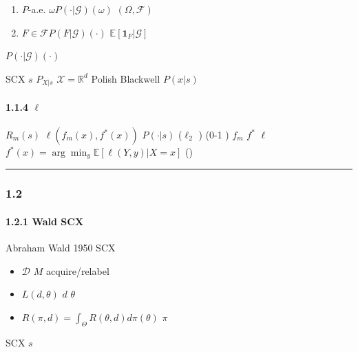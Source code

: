 \documentclass[
  12pt,
]{article}
\providecommand{\tightlist}{%
  \setlength{\itemsep}{0pt}\setlength{\parskip}{0pt}}
\begin{document}
\begin{enumerate}
\def\labelenumi{\arabic{enumi}.}
\tightlist
\item
   \(P\)-a.e. \(\omega\)\(P(\cdot|\mathcal{G})(\omega)\) 
  \((\Omega, \mathcal{F})\) 
\item
   \(F \in \mathcal{F}\)\(P(F|\mathcal{G})(\cdot)\) 
  \(\mathbb{E}[\mathbf{1}_F|\mathcal{G}]\) 
\end{enumerate}

 \(P(\cdot|\mathcal{G})(\cdot)\) 

 SCX  \(s\)  \(P_{X|s}\)
\(\mathcal{X} = \mathbb{R}^d\)  Polish 
Blackwell  \(P(x|s)\) 

\paragraph{\texorpdfstring{1.1.4  \(\ell\)
}{1.1.4  \textbackslash ell }}\label{ux635fux5931ux51fdux6570-ell-ux7684ux53efux79efux6027ux6761ux4ef6}

\(R_m(s)\)  \(\ell(f_m(x), f^*(x))\)  \(P(\cdot|s)\)
 (\(\ell_2\) )  (0-1 ) \(f_m\)
 \(f^*\)  \(\ell\) 
\(f^*(x) = \arg\min_y \mathbb{E}[\ell(Y, y)|X=x]\)
()

\begin{center}\rule{0.5\linewidth}{0.5pt}\end{center}

\subsubsection{1.2
}\label{ux7edfux8ba1ux51b3ux7b56ux7406ux8bbaux4e0eux8d1dux53f6ux65afux98ceux9669}

\paragraph{1.2.1  Wald  SCX}\label{ux4ece-wald-ux5230-scx}

Abraham Wald  1950  SCX


\begin{itemize}
\tightlist
\item
  \textbf{} \(\mathcal{D}\) \(M\)
  acquire/relabel
\item
  \textbf{} \(L(d, \theta)\) \(d\) 
  \(\theta\) 
\item
  \textbf{}
  \(R(\pi, d) = \int_\Theta R(\theta, d) d\pi(\theta)\) \(\pi\)
  
\end{itemize}

SCX \textbf{} \(s\)
\end{document}
